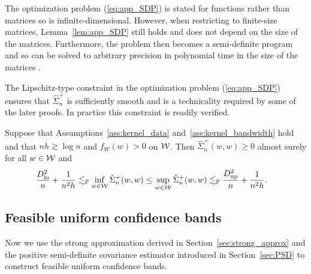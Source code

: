 \begin{remark}

  The optimization problem (\ref{eq:app_SDP}) is stated for functions
  rather than matrices so is infinite-dimensional.
  However, when restricting to finite-size matrices,
  Lemma~\ref{lem:app_SDP} still holds and does not depend on
  the size of the matrices.
  Furthermore, the problem
  then becomes a semi-definite program and so can be solved to
  arbitrary precision in polynomial time
  in the size of the matrices
  \citep{laurent2005semidefinite}.

  The Lipschitz-type constraint in the
  optimization problem (\ref{eq:app_SDP})
  ensures that $\hat \Sigma_n^+$
  is sufficiently smooth
  and is a technicality required by
  some of the later proofs.
  In practice this constraint is readily verified.

\end{remark}

\begin{lemma}
  \label{lem:variance_estimator_bounds}

  Suppose that Assumptions~\ref{ass:kernel_data}
  and~\ref{ass:kernel_bandwidth} hold and that
  $nh \gtrsim \log n$ and $f_W(w) > 0$ on $\mathcal{W}$.
  Then $\hat \Sigma_n^+(w,w) \geq 0$
  almost surely for all $w \in \mathcal{W}$ and
  \begin{align*}
    \frac{D_{\textup{lo}}^2}{n} + \frac{1}{n^2h}
    &\lesssim_{\mathbb{P}}
    \inf_{w \in \mathcal{W}} \hat \Sigma_n^+(w,w)
    \leq
    \sup_{w \in \mathcal{W}} \hat \Sigma_n^+(w,w)
    \lesssim_{\mathbb{P}}
    \frac{D_{\textup{up}}^2}{n} + \frac{1}{n^2h}.
  \end{align*}

\end{lemma}

\subsection{Feasible uniform confidence bands}
\label{sec:app_feasible_confidence_bands}

Now we use the strong approximation derived in
Section~\ref{sec:strong_approx} and the
positive semi-definite covariance estimator introduced in
Section~\ref{sec:PSD} to construct feasible uniform confidence bands.

